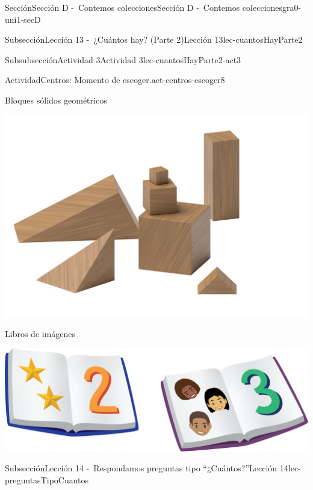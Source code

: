 \documentclass[twoside,10pt,]{article}
\begin{document}
\begin{sectionptx}{Sección}{Sección D -~Contemos colecciones}{}{Sección D -~Contemos colecciones}{}{}{gra0-uni1-secD}
\begin{subsectionptx}{Subsección}{Lección 13 -~¿Cuántos hay? (Parte 2)}{}{Lección 13}{}{}{lec-cuantosHayParte2}
\begin{subsubsectionptx}{Subsubsección}{Actividad 3}{}{Actividad 3}{}{}{lec-cuantosHayParte2-act3}
\begin{activity}{Actividad}{Centros: Momento de escoger.}{act-centros-escoger8}
\begin{sidebyside}{2}{0.025}{0.025}{0.05}
\begin{sbspanel}{0.45}
\end{sbspanel}%
\end{sidebyside}%
\begin{sidebyside}{2}{0.025}{0.025}{0.05}%
\begin{sbspanel}{0.45}%
Bloques sólidos geométricos%
\par
\includegraphics[width=\linewidth]{external/png-source/K.1.A Beta Student Workbook.Geoblocks.png}
\end{sbspanel}%
\begin{sbspanel}{0.45}%
Libros de imágenes%
\par
\includegraphics[width=\linewidth]{external/png-source/K.1.D Beta Student Workbooks.Books.png}
\end{sbspanel}%
\end{sidebyside}%
\end{activity}%
\end{subsubsectionptx}
\end{subsectionptx}
%
%
\typeout{************************************************}
\typeout{************************************************}
%
\begin{subsectionptx}{Subsección}{Lección 14 -~Respondamos preguntas tipo “¿Cuántos?”}{}{Lección 14}{}{}{lec-preguntasTipoCuantos}

\end{subsectionptx}
\end{sectionptx}
\end{document}
